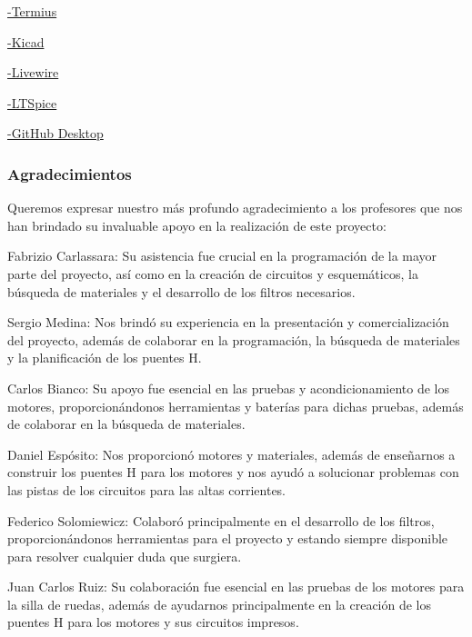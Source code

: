 \documentclass{article}
\begin{document}
    \href{https://termius.com/}{-Termius}
    \newline

    \href{https://www.kicad.org/}{-Kicad}
    \newline

    \href{https://livewire.laravel.com/}{-Livewire}
    \newline

    \href{https://www.analog.com/en/resources/design-tools-and-calculators/ltspice-simulator.html}{-LTSpice}
    \newline

    \href{https://github.com/apps/desktop}{-GitHub Desktop}

\subsubsection{Agradecimientos}

Queremos expresar nuestro más profundo agradecimiento a los profesores que nos han brindado su invaluable apoyo en la realización de este proyecto:


Fabrizio Carlassara: Su asistencia fue crucial en la programación de la mayor parte del proyecto, así como en la creación de circuitos y esquemáticos, la búsqueda de materiales y el desarrollo de los filtros necesarios.


Sergio Medina: Nos brindó su experiencia en la presentación y comercialización del proyecto, además de colaborar en la programación, la búsqueda de materiales y la planificación de los puentes H.


Carlos Bianco: Su apoyo fue esencial en las pruebas y acondicionamiento de los motores, proporcionándonos herramientas y baterías para dichas pruebas, además de colaborar en la búsqueda de materiales.


Daniel Espósito: Nos proporcionó motores y materiales, además de enseñarnos a construir los puentes H para los motores y nos ayudó a solucionar problemas con las pistas de los circuitos para las altas corrientes.


Federico Solomiewicz: Colaboró principalmente en el desarrollo de los filtros, proporcionándonos herramientas para el proyecto y estando siempre disponible para resolver cualquier duda que surgiera.


Juan Carlos Ruiz: Su colaboración fue esencial en las pruebas de los motores para la silla de ruedas, además de ayudarnos principalmente en la creación de los puentes H para los motores y sus circuitos impresos.
\end{document}
